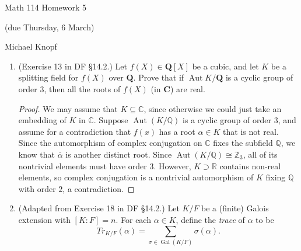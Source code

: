 \documentclass[10pt]{article}
\newcommand{\Q}{\mathbb{Q}}
\newcommand{\Z}{\mathbb{Z}}
\DeclareMathOperator*{\Aut}{Aut}
\DeclareMathOperator*{\Gal}{Gal}
\begin{document}
\begin{center}
\large Math 114 Homework 5

\normalsize (due Thursday, 6 March)

Michael Knopf
\end{center}

\begin{enumerate}

\item (Exercise 13 in DF \S 14.2.) Let $f(X) \in \mathbf{Q}[X]$ be a cubic, and let $K$ be a splitting field for $f(X)$ over $\mathbf{Q}$.  Prove that if $\Aut K/\mathbf{Q}$ is a cyclic group of order $3$, then all the roots of $f(X)$ (in $\mathbf{C}$) are real.

\begin{proof}

We may assume that $K \subseteq \mathbb{C}$, since otherwise we could just take an embedding of $K$ in $\mathbb{C}$.  Suppose $\Aut(K/\Q)$ is a cyclic group of order $3$, and assume for a contradiction that $f(x)$ has a root $\alpha \in K$ that is not real.  Since the automorphism of complex conjugation on $\mathbb{C}$ fixes the subfield $\mathbb{Q}$, we know that $\overline{\alpha}$ is another distinct root.  Since $\Aut (K/\Q) \cong \Z_3$, all of its nontrivial elements must have order $3$.  However, $K \supset \mathbb{R}$ contains non-real elements, so complex conjugation is a nontrivial automorphism of $K$ fixing $\Q$ with order $2$, a contradiction.


\end{proof}

\item (Adapted from Exercise 18 in DF \S 14.2.) Let $K/F$ be a (finite) Galois extension with $[K:F]=n$.  For each $\alpha \in K$, define the \emph{trace} of $\alpha$ to be 
\[
Tr_{K/F}(\alpha) = \sum_{\sigma \in \Gal (K/F)} \sigma(\alpha) \text{.}
\]


\end{enumerate}
\end{document}
